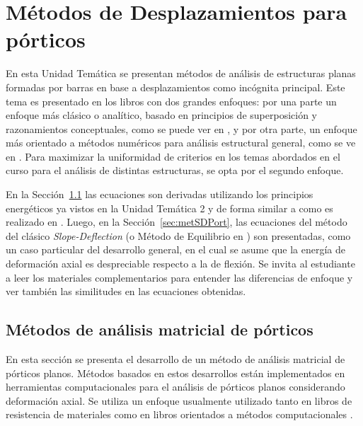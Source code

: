 
\chapter[Métodos de Desplazamientos para pórticos]{Métodos de Desplazamientos para pórticos}

En esta Unidad Temática se presentan métodos de análisis de estructuras planas formadas por barras en base a desplazamientos como incógnita principal. %
%
Este tema es presentado en los libros con dos grandes enfoques: por una parte un enfoque más clásico o analítico, basado en principios de superposición y razonamientos conceptuales, como se puede ver en \citep{Timoshenko1940a,CerveraRuiz2002ii}, y por otra parte, un enfoque más orientado a métodos numéricos para análisis estructural general, como se ve en \citep{Onate2013,Pilkey2002,Wunderlich2002}. %
%
Para maximizar la uniformidad de criterios en los temas abordados en el curso para el análisis de distintas estructuras, se opta por el segundo enfoque. %

En la Sección~\ref{sec:analiMatPort} las ecuaciones son derivadas utilizando los principios energéticos ya vistos en la Unidad Temática 2 y de forma similar a como es realizado en \citep{Reddy2002b}. %
%
Luego, en la Sección~\ref{sec:metSDPort}, las ecuaciones del método del clásico \textit{Slope-Deflection} (o Método de Equilibrio en \citep{CerveraRuiz2002ii}) son presentadas, como un caso particular del desarrollo general, en el cual se asume que la energía de deformación axial es despreciable respecto a la de flexión. %
%
Se invita al estudiante a leer los materiales complementarios para entender las diferencias de enfoque y ver también las similitudes en las ecuaciones obtenidas.




\section{Métodos de análisis matricial de pórticos} \label{sec:analiMatPort}

En esta sección se presenta el desarrollo de un método de análisis matricial de pórticos planos. %
%
Métodos basados en estos desarrollos están implementados en herramientas computacionales para el análisis de pórticos planos considerando deformación axial. %
Se utiliza un enfoque usualmente utilizado tanto en libros de resistencia de materiales \citep{Pilkey2002} como en libros orientados a métodos computacionales \citep{Onate2013}. %


